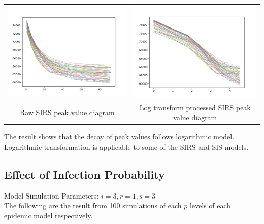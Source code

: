 \documentclass{subfile}
\begin{document}
\begin{tabular}{cc}
    \includegraphics[scale=0.5]{SIRSp05chaos} & \includegraphics[scale=0.5]{logTrSIRSp05}\\
    Raw SIRS peak value diagram & Log transform processed SIRS peak value diagram\\
  \end{tabular}

  The result shows that the decay of peak values follows logarithmic model. Logarithmic transformation is applicable to some of the SIRS and SIS models.

  \subsection{Effect of Infection Probability}
  Model Simulation Parameters: \(i=3, r=1, s=3\)\\
  The following are the result from 100 simulations of each \(p\) levels of each epidemic model respectively.
\end{document}
